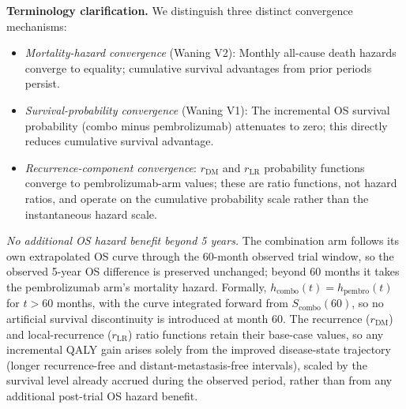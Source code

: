 \documentclass[11pt,a4paper]{article}
\begin{document}
\textbf{Terminology clarification.} We distinguish three distinct convergence mechanisms:
\begin{itemize}[leftmargin=*]
\item \textit{Mortality-hazard convergence} (Waning V2): Monthly all-cause death hazards converge to equality; cumulative survival advantages from prior periods persist.
\item \textit{Survival-probability convergence} (Waning V1): The incremental OS survival probability (combo minus pembrolizumab) attenuates to zero; this directly reduces cumulative survival advantage.
\item \textit{Recurrence-component convergence}: $r_{\text{DM}}$ and $r_{\text{LR}}$ probability functions converge to pembrolizumab-arm values; these are ratio functions, not hazard ratios, and operate on the cumulative probability scale rather than the instantaneous hazard scale.
\end{itemize}

\textit{No additional OS hazard benefit beyond 5 years.} The combination arm follows its own extrapolated OS curve through the 60-month observed trial window, so the observed 5-year OS difference is preserved unchanged; beyond 60 months it takes the pembrolizumab arm's mortality hazard. Formally, $h_{\text{combo}}(t) = h_{\text{pembro}}(t)$ for $t > 60$ months, with the curve integrated forward from $S_{\text{combo}}(60)$, so no artificial survival discontinuity is introduced at month 60. The recurrence ($r_{\text{DM}}$) and local-recurrence ($r_{\text{LR}}$) ratio functions retain their base-case values, so any incremental QALY gain arises solely from the improved disease-state trajectory (longer recurrence-free and distant-metastasis-free intervals), scaled by the survival level already accrued during the observed period, rather than from any additional post-trial OS hazard benefit.
\end{document}
